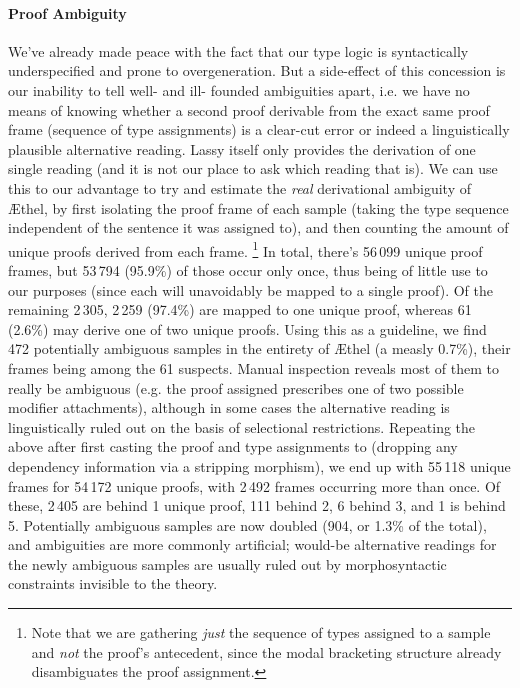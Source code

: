 \paragraph{Proof Ambiguity}
We've already made peace with the fact that our type logic is syntactically underspecified and prone to overgeneration.
But a side-effect of this concession is our inability to tell well- and ill- founded ambiguities apart, i.e. we have no means of knowing whether a second proof derivable from the exact same proof frame (sequence of type assignments) is a clear-cut error or indeed a linguistically plausible alternative reading.
Lassy itself only provides the derivation of one single reading (and it is not our place to ask which reading that is).
We can use this to our advantage to try and estimate the \textit{real} derivational ambiguity of \AE thel, by first isolating the proof frame of each sample (taking the type sequence independent of the sentence it was assigned to), and then counting the amount of unique proofs derived from each frame.%
	\footnote{Note that we are gathering \textit{just} the sequence of types assigned to a sample and \textit{not} the proof's antecedent, since the modal bracketing structure already disambiguates the proof assignment.}
In total, there's 56\,099 unique proof frames, but 53\,794 (95.9\%) of those occur only once, thus being of little use to our purposes (since each will unavoidably be mapped to a single proof).
Of the remaining 2\,305, 2\,259 (97.4\%) are mapped to one unique proof, whereas 61 (2.6\%) may derive one of two unique proofs.
Using this as a guideline, we find 472 potentially ambiguous samples in the entirety of \AE thel (a measly 0.7\%), their frames being among the 61 suspects.
Manual inspection reveals most of them to really be ambiguous (e.g. the proof assigned prescribes one of two possible modifier attachments), 
although in some cases the alternative reading is linguistically ruled out on the basis of selectional restrictions.
Repeating the above after first casting the proof and type assignments to \NLP{} (dropping any dependency information via a stripping morphism), we end up with 55\,118 unique frames for 54\,172 unique proofs, with 2\,492 frames occurring more than once.
Of these, 2\,405 are behind 1 unique proof, 111 behind 2, 6 behind 3, and 1 is behind 5.
Potentially ambiguous samples are now doubled (904, or 1.3\% of the total), and ambiguities are more commonly artificial; would-be alternative readings for the newly ambiguous samples are usually ruled out by morphosyntactic constraints invisible to the theory.

